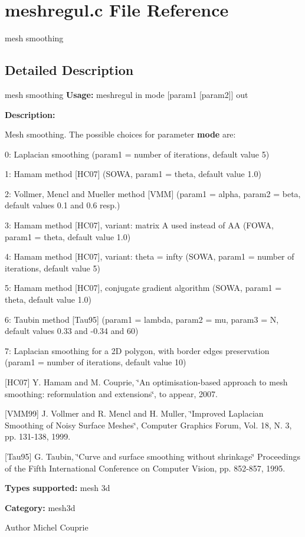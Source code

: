 \section{meshregul.c File Reference}
\label{meshregul_8c}


mesh smoothing  




\subsection{Detailed Description}
mesh smoothing {\bfseries Usage:} meshregul in mode [param1 [param2]] out

{\bfseries Description:}

Mesh smoothing. The possible choices for parameter {\bfseries mode} are: \begin{DoxyItemize}
\item 0: Laplacian smoothing (param1 = number of iterations, default value 5) \item 1: Hamam method [HC07] (SOWA, param1 = theta, default value 1.0) \item 2: Vollmer, Mencl and Mueller method [VMM] (param1 = alpha, param2 = beta, default values 0.1 and 0.6 resp.) \item 3: Hamam method [HC07], variant: matrix A used instead of AA (FOWA, param1 = theta, default value 1.0) \item 4: Hamam method [HC07], variant: theta = infty (SOWA, param1 = number of iterations, default value 5) \item 5: Hamam method [HC07], conjugate gradient algorithm (SOWA, param1 = theta, default value 1.0) \item 6: Taubin method [Tau95] (param1 = lambda, param2 = mu, param3 = N, default values 0.33 and -\/0.34 and 60) \item 7: Laplacian smoothing for a 2D polygon, with border edges preservation (param1 = number of iterations, default value 10)\end{DoxyItemize}
[HC07] Y. Hamam and M. Couprie, \char`\"{}An optimisation-\/based approach to mesh smoothing: reformulation and extensions\char`\"{}, to appear, 2007.

[VMM99] J. Vollmer and R. Mencl and H. Muller, \char`\"{}Improved Laplacian Smoothing of Noisy Surface Meshes\char`\"{}, Computer Graphics Forum, Vol. 18, N. 3, pp. 131-\/138, 1999.

[Tau95] G. Taubin, \char`\"{}Curve and surface smoothing without shrinkage\char`\"{} Proceedings of the Fifth International Conference on Computer Vision, pp. 852-\/857, 1995.

{\bfseries Types supported:} mesh 3d

{\bfseries Category:} mesh3d

\begin{DoxyAuthor}{Author}
Michel Couprie 
\end{DoxyAuthor}
